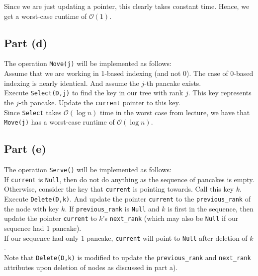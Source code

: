\documentclass[12pt]{article}
\begin{document}
Since we are just updating a pointer, this clearly takes constant time. Hence, we get a worst-case runtime of $\mathcal{O}(1)$.

\subsection*{Part (d)}

The operation \verb|Move(j)| will be implemented as follows: \\

Assume that we are working in 1-based indexing (and not 0). The case of 0-based indexing is nearly identical. And assume the $j$-th pancake exists. \\

Execute \verb|Select(D,j)| to find the key in our tree with rank $j$. This key represents the $j$-th pancake. Update the \verb|current| pointer to this key. \\

Since \verb|Select| takes $\mathcal{O}(\log n)$ time in the worst case from lecture, we have that \verb|Move(j)| has a worst-case runtime of $\mathcal{O}(\log n)$. 

\subsection*{Part (e)}

The operation \verb|Serve()| will be implemented as follows: \\

If \verb|current| is \verb|Null|, then do not do anything as the sequence of pancakes is empty. \\

Otherwise, consider the key that \verb|current| is pointing towards. Call this key $k$. \\

Execute \verb|Delete(D,k)|. And update the pointer \verb|current| to the \verb|previous_rank| of the node with key $k$. If \verb|previous_rank| is \verb|Null| and $k$ is first in the sequence, then update the pointer \verb|current| to $k$'s \verb|next_rank| (which may also be \verb|Null| if our sequence had 1 pancake). \\

If our sequence had only 1 pancake, \verb|current| will point to \verb|Null| after deletion of $k$. \\

Note that \verb|Delete(D,k)| is modified to update the \verb|previous_rank| and \verb|next_rank| attributes upon deletion of nodes as discussed in part a). \\
\end{document}
